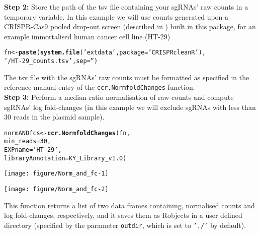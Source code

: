 \documentclass{article}\usepackage[]{graphicx}\usepackage[]{color}
\makeatletter
\def\maxwidth{ %
  \ifdim\Gin@nat@width>\linewidth
    \linewidth
  \else
    \Gin@nat@width
  \fi
}
\newcommand{\hlnum}[1]{\textcolor[rgb]{0.686,0.059,0.569}{#1}}%
\newcommand{\hlstr}[1]{\textcolor[rgb]{0.192,0.494,0.8}{#1}}%
\newcommand{\hlstd}[1]{\textcolor[rgb]{0.345,0.345,0.345}{#1}}%
\newcommand{\hlkwb}[1]{\textcolor[rgb]{0.69,0.353,0.396}{#1}}%
\newcommand{\hlkwc}[1]{\textcolor[rgb]{0.333,0.667,0.333}{#1}}%
\newcommand{\hlkwd}[1]{\textcolor[rgb]{0.737,0.353,0.396}{\textbf{#1}}}%
\newenvironment{kframe}{%
 \def\at@end@of@kframe{}%
 \ifinner\ifhmode%
  \def\at@end@of@kframe{\end{minipage}}%
  \begin{minipage}{\columnwidth}%
 \fi\fi%
 \def\FrameCommand##1{\hskip\@totalleftmargin \hskip-\fboxsep
 \colorbox{shadecolor}{##1}\hskip-\fboxsep
     \hskip-\linewidth \hskip-\@totalleftmargin \hskip\columnwidth}%
 \MakeFramed {\advance\hsize-\width
   \@totalleftmargin\z@ \linewidth\hsize
   \@setminipage}}%
 {\par\unskip\endMakeFramed%
 \at@end@of@kframe}
\newenvironment{knitrout}{}{} %
\makeatother
\begin{document}
\textbf{Step 2:} Store the path of the tsv file containing your sgRNAs' raw counts in a temporary variable. In this example we will use counts generated upon a CRISPR-Cas9 pooled drop-out screen (described in \cite{Iorio:2017}) built in this package, for an example immortalised human cancer cell line (HT-29)

\begin{knitrout}
\color{fgcolor}\begin{kframe}
\begin{alltt}
 \hlstd{fn}\hlkwb{<-}\hlkwd{paste}\hlstd{(}\hlkwd{system.file}\hlstd{(}\hlstr{'extdata'}\hlstd{,}\hlkwc{package} \hlstd{=} \hlstr{'CRISPRcleanR'}\hlstd{),}
           \hlstr{'/HT-29_counts.tsv'}\hlstd{,}\hlkwc{sep}\hlstd{=}\hlstr{''}\hlstd{)}
\end{alltt}
\end{kframe}
\end{knitrout}

The tsv file with the sgRNAs' raw counts must be formatted as specified in the reference manual entry of the \texttt{ccr.NormfoldChanges} function.\\

\textbf{Step 3:} Perform a median-ratio normalisation of raw counts and compute sgRNAs' log fold-changes (in this example we will exclude sgRNAs with less than 30 reads in the plasmid sample).

\begin{knitrout}
\color{fgcolor}\begin{kframe}
\begin{alltt}
\hlstd{normANDfcs}\hlkwb{<-}\hlkwd{ccr.NormfoldChanges}\hlstd{(fn,}
                                 \hlkwc{min_reads}\hlstd{=}\hlnum{30}\hlstd{,}
                                 \hlkwc{EXPname}\hlstd{=}\hlstr{'HT-29'}\hlstd{,}
                                 \hlkwc{libraryAnnotation}\hlstd{=KY_Library_v1.0)}
\end{alltt}
\end{kframe}
\texttt{[image: figure/Norm\_and\_fc-1]} 

\texttt{[image: figure/Norm\_and\_fc-2]} 

\end{knitrout}

This function returns a list of two data frames containing, normalised counts and log fold-changes, respectively, and it saves them as Robjects in a user defined directory (specified by the parameter \texttt{outdir}, which is set to \texttt{'./'} by default).
\end{document}
